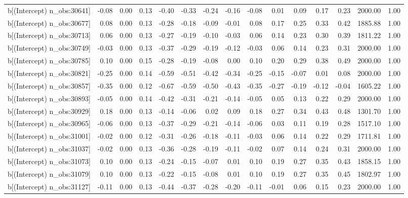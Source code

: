\begin{table}[ht]
\begin{tabular}{rrrrrrrrrrrrrrr}
  b[(Intercept) n\_obs:30641] & -0.08 & 0.00 & 0.13 & -0.40 & -0.33 & -0.24 & -0.16 & -0.08 & 0.01 & 0.09 & 0.17 & 0.23 & 2000.00 & 1.00 \\ 
  b[(Intercept) n\_obs:30677] & 0.08 & 0.00 & 0.13 & -0.28 & -0.18 & -0.09 & -0.01 & 0.08 & 0.17 & 0.25 & 0.33 & 0.42 & 1885.88 & 1.00 \\ 
  b[(Intercept) n\_obs:30713] & 0.06 & 0.00 & 0.13 & -0.27 & -0.19 & -0.10 & -0.03 & 0.06 & 0.14 & 0.23 & 0.30 & 0.39 & 1811.22 & 1.00 \\ 
  b[(Intercept) n\_obs:30749] & -0.03 & 0.00 & 0.13 & -0.37 & -0.29 & -0.19 & -0.12 & -0.03 & 0.06 & 0.14 & 0.23 & 0.31 & 2000.00 & 1.00 \\ 
  b[(Intercept) n\_obs:30785] & 0.10 & 0.00 & 0.15 & -0.28 & -0.19 & -0.08 & 0.00 & 0.10 & 0.20 & 0.29 & 0.38 & 0.49 & 2000.00 & 1.00 \\ 
  b[(Intercept) n\_obs:30821] & -0.25 & 0.00 & 0.14 & -0.59 & -0.51 & -0.42 & -0.34 & -0.25 & -0.15 & -0.07 & 0.01 & 0.08 & 2000.00 & 1.00 \\ 
  b[(Intercept) n\_obs:30857] & -0.35 & 0.00 & 0.12 & -0.67 & -0.59 & -0.50 & -0.43 & -0.35 & -0.27 & -0.19 & -0.12 & -0.04 & 1605.22 & 1.00 \\ 
  b[(Intercept) n\_obs:30893] & -0.05 & 0.00 & 0.14 & -0.42 & -0.31 & -0.21 & -0.14 & -0.05 & 0.05 & 0.13 & 0.22 & 0.29 & 2000.00 & 1.00 \\ 
  b[(Intercept) n\_obs:30929] & 0.18 & 0.00 & 0.13 & -0.14 & -0.06 & 0.02 & 0.09 & 0.18 & 0.27 & 0.34 & 0.43 & 0.48 & 1301.70 & 1.00 \\ 
  b[(Intercept) n\_obs:30965] & -0.06 & 0.00 & 0.13 & -0.37 & -0.29 & -0.21 & -0.14 & -0.06 & 0.03 & 0.11 & 0.19 & 0.28 & 1517.10 & 1.00 \\ 
  b[(Intercept) n\_obs:31001] & -0.02 & 0.00 & 0.12 & -0.31 & -0.26 & -0.18 & -0.11 & -0.03 & 0.06 & 0.14 & 0.22 & 0.29 & 1711.81 & 1.00 \\ 
  b[(Intercept) n\_obs:31037] & -0.02 & 0.00 & 0.13 & -0.36 & -0.28 & -0.19 & -0.11 & -0.02 & 0.07 & 0.14 & 0.24 & 0.31 & 2000.00 & 1.00 \\ 
  b[(Intercept) n\_obs:31073] & 0.10 & 0.00 & 0.13 & -0.24 & -0.15 & -0.07 & 0.01 & 0.10 & 0.19 & 0.27 & 0.35 & 0.43 & 1858.15 & 1.00 \\ 
  b[(Intercept) n\_obs:31079] & 0.10 & 0.00 & 0.13 & -0.22 & -0.15 & -0.08 & 0.01 & 0.10 & 0.19 & 0.27 & 0.35 & 0.45 & 1802.97 & 1.00 \\ 
  b[(Intercept) n\_obs:31127] & -0.11 & 0.00 & 0.13 & -0.44 & -0.37 & -0.28 & -0.20 & -0.11 & -0.01 & 0.06 & 0.15 & 0.23 & 2000.00 & 1.00 \\ 

\end{tabular}
\end{table}
